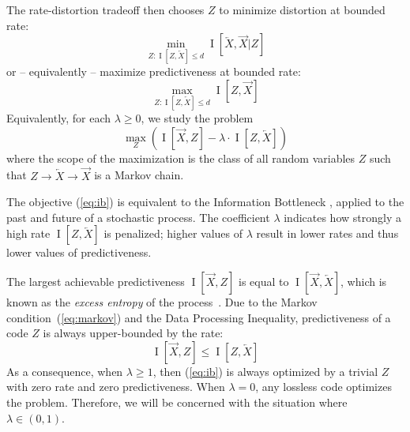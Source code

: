 \documentclass[11pt,letterpaper]{article}
\begin{document}
The rate-distortion tradeoff then chooses $Z$ to %
 minimize distortion at bounded rate:
\begin{equation}
\min_{Z :  \operatorname{I}[Z, \overleftarrow{X}] \leq d}  \operatorname{I}[\overleftarrow{X}, \overrightarrow{X}|Z] 
\end{equation}
or -- equivalently -- maximize predictiveness at bounded rate:
\begin{equation}
\max_{Z :  \operatorname{I}[Z, \overleftarrow{X}] \leq d}  \operatorname{I}[Z, \overrightarrow{X}] 
\end{equation}
Equivalently, for each  $\lambda \geq 0$, we study the problem 
\begin{equation}\label{eq:ib}
	\max_{Z} \left( \operatorname{I}[\overrightarrow{X}, Z] - \lambda \cdot \operatorname{I}[Z, \overleftarrow{X}] \right)
\end{equation}
where the scope of the maximization is the class of all random variables $Z$ such that $Z \rightarrow \overleftarrow{X} \rightarrow \overrightarrow{X}$ is a Markov chain. %

The objective (\ref{eq:ib}) is equivalent to the Information Bottleneck \citep{tishby-information-1999}, applied to the past and future of a stochastic process.
The coefficient $\lambda$ indicates how strongly a high rate $\operatorname{I}[Z, \overleftarrow{X}]$ is penalized; higher values of $\lambda$ result in lower rates and thus lower values of predictiveness.


The largest achievable predictiveness $\operatorname{I}[\overrightarrow{X}, Z]$ is equal to $\operatorname{I}[\overrightarrow{X}, \overleftarrow{X}]$, which is known as the \emph{excess entropy} of the process~\citep{feldman-synchronizing-2004}.
Due to the Markov condition~(\ref{eq:markov}) and the Data Processing Inequality, predictiveness of a code $Z$ is always upper-bounded by the rate:
\begin{equation}
\operatorname{I}[\overrightarrow{X}, Z] \leq \operatorname{I}[Z, \overleftarrow{X}] 
\end{equation}
As a consequence, when $\lambda \geq 1$, then (\ref{eq:ib}) is always optimized by a trivial $Z$ with zero rate and zero predictiveness.
When $\lambda = 0$, any lossless code optimizes the problem.
Therefore, we will be concerned with the situation where $\lambda \in (0,1)$.
\end{document}
